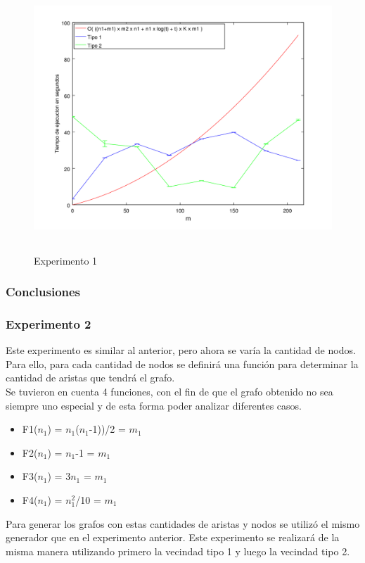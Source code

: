     \begin{figure}[H]
      \includegraphics[height=10cm]{graficos/ejercicio6-exp1.png}
       \caption{Experimento 1}
	\end{figure}
\subsubsection*{Conclusiones}\;
        
        
        
\subsubsection*{Experimento 2}\;
\noindent Este experimento es similar al anterior, pero ahora se varía la cantidad de nodos. Para ello, para cada cantidad de nodos se definirá una función para determinar la cantidad de aristas que tendrá el grafo. \\
\noindent Se tuvieron en cuenta 4 funciones, con el fin de que el grafo obtenido no sea siempre uno especial y de esta forma poder analizar diferentes casos. 
        \begin{itemize}
        \item F1($n_1$) = $n_1$($n_1$-1))/2 = $m_1$ 
        \item F2($n_1$) = $n_1$-1 = $m_1$ 
        \item F3($n_1$) = 3$n_1$ = $m_1$ 
        \item F4($n_1$) = $n_1^{2}$/10 = $m_1$ 
		\end{itemize} 
Para generar los grafos con estas cantidades de aristas y nodos se utilizó el mismo generador que en el experimento anterior.
Este experimento se realizará de la misma manera utilizando primero la vecindad tipo 1 y luego la vecindad tipo 2.


